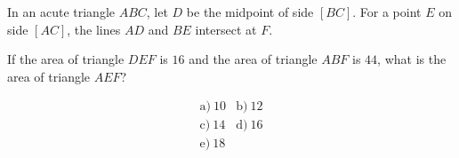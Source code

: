 In an acute triangle \(ABC\), let \(D\) be the midpoint of side \([BC]\). For a point \(E\) on side \([AC]\), the lines \(AD\) and \(BE\) intersect at \(F\).



If the area of triangle \(DEF\) is \(16\) and the area of triangle \(ABF\) is \(44\), what is the area of triangle \(AEF\)?



\[
\begin{array}{ll}
\text{a)}\ 10 & \text{b)}\ 12 \\
\text{c)}\ 14 & \text{d)}\ 16 \\
\text{e)}\ 18
\end{array}
\]
